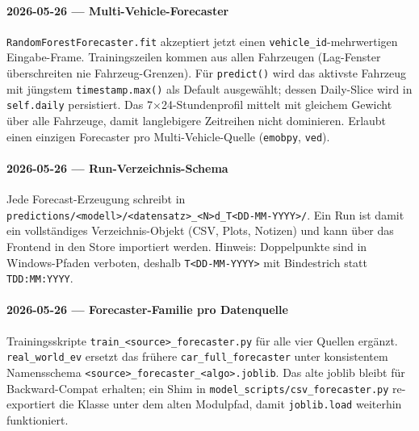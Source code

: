 \paragraph{2026-05-26 --- Multi-Vehicle-Forecaster}
\texttt{RandomForestForecaster.fit} akzeptiert jetzt einen
\texttt{vehicle\_id}-mehrwertigen Eingabe-Frame. Trainingszeilen kommen aus
allen Fahrzeugen (Lag-Fenster überschreiten nie Fahrzeug-Grenzen). Für
\texttt{predict()} wird das aktivste Fahrzeug mit jüngstem
\texttt{timestamp.max()} als Default ausgewählt; dessen Daily-Slice wird
in \texttt{self.daily} persistiert. Das 7$\times$24-Stundenprofil mittelt
mit gleichem Gewicht über alle Fahrzeuge, damit langlebigere Zeitreihen
nicht dominieren. Erlaubt einen einzigen Forecaster pro Multi-Vehicle-Quelle
(\texttt{emobpy}, \texttt{ved}).

\paragraph{2026-05-26 --- Run-Verzeichnis-Schema}
Jede Forecast-Erzeugung schreibt in
\texttt{predictions/<modell>/<datensatz>\_<N>d\_T<DD-MM-YYYY>/}. Ein Run
ist damit ein vollständiges Verzeichnis-Objekt (CSV, Plots, Notizen) und
kann über das Frontend in den Store importiert werden. Hinweis: Doppelpunkte
sind in Windows-Pfaden verboten, deshalb \texttt{T<DD-MM-YYYY>} mit
Bindestrich statt \texttt{TDD:MM:YYYY}.

\paragraph{2026-05-26 --- Forecaster-Familie pro Datenquelle}
Trainingsskripte
\texttt{train\_<source>\_forecaster.py} für alle vier Quellen ergänzt.
\texttt{real\_world\_ev} ersetzt das frühere \texttt{car\_full\_forecaster}
unter konsistentem Namensschema \texttt{<source>\_forecaster\_<algo>.joblib}.
Das alte joblib bleibt für Backward-Compat erhalten; ein Shim in
\texttt{model\_scripts/csv\_forecaster.py} re-exportiert die Klasse unter
dem alten Modulpfad, damit \texttt{joblib.load} weiterhin funktioniert.

\color{black}

\clearpage